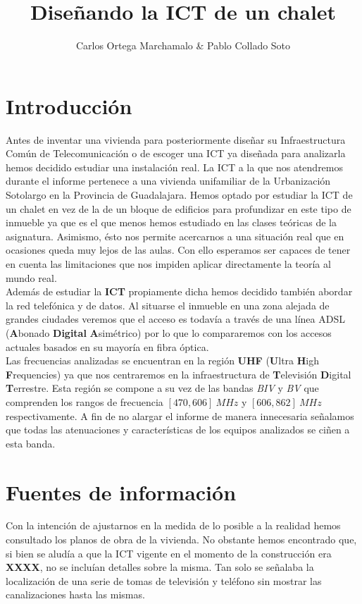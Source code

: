 \documentclass{article}[12 pt]
\title{Diseñando la ICT de un chalet}
\author{Carlos Ortega Marchamalo \& Pablo Collado Soto}
\date{}
\begin{document}
	\maketitle

	\section{Introducción}
		Antes de inventar una vivienda para posteriormente diseñar su Infraestructura Común de Telecomunicación o de escoger una ICT ya diseñada para analizarla hemos decidido estudiar una instalación real. La ICT a la que nos atendremos durante el informe pertenece a una vivienda unifamiliar de la Urbanización Sotolargo en la Provincia de Guadalajara. Hemos optado por estudiar la ICT de un chalet en vez de la de un bloque de edificios para profundizar en este tipo de inmueble ya que es el que menos hemos estudiado en las clases teóricas de la asignatura. Asimismo, ésto nos permite acercarnos a una situación real que en ocasiones queda muy lejos de las aulas. Con ello esperamos ser capaces de tener en cuenta las limitaciones que nos impiden aplicar directamente la teoría al mundo real.\\

		Además de estudiar la \textbf{ICT} propiamente dicha hemos decidido también abordar la red telefónica y de datos. Al situarse el inmueble en una zona alejada de grandes ciudades veremos que el acceso es todavía a través de una línea ADSL (\textbf{A}bonado \textbf{Digital} \textbf{A}simétrico) por lo que lo compararemos con los accesos actuales basados en su mayoría en fibra óptica.\\

		Las frecuencias analizadas se encuentran en la región \textbf{UHF} (\textbf{U}ltra \textbf{H}igh \textbf{F}requencies) ya que nos centraremos en la infraestructura de \textbf{T}elevisión \textbf{D}igital \textbf{T}errestre. Esta región se compone a su vez de las bandas \textit{BIV} y \textit{BV} que comprenden los rangos de frecuencia $[470, 606]\ MHz$ y $[606, 862]\ MHz$ respectivamente. A fin de no alargar el informe de manera innecesaria señalamos que todas las atenuaciones y características de los equipos analizados se ciñen a esta banda.\\

	\section{Fuentes de información}
		Con la intención de ajustarnos en la medida de lo posible a la realidad hemos consultado los planos de obra de la vivienda. No obstante hemos encontrado que, si bien se aludía a que la ICT vigente en el momento de la construcción era \textbf{XXXX}, no se incluían detalles sobre la misma. Tan solo se señalaba la localización de una serie de tomas de televisión y teléfono sin mostrar las canalizaciones hasta las mismas.\\
\end{document}
